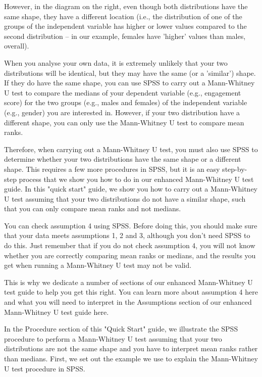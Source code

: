 \documentclass[]{article}
\begin{document}
However, in the diagram on the right, even though both distributions have the same shape, they have a different location (i.e., the distribution of one of the groups of the independent variable has higher or lower values compared to the second distribution – in our example, females have 'higher' values than males, overall).

When you analyse your own data, it is extremely unlikely that your two distributions will be identical, but they may have the same (or a 'similar') shape. If they do have the same shape, you can use SPSS to carry out a Mann-Whitney U test to compare the medians of your dependent variable (e.g., engagement score) for the two groups (e.g., males and females) of the independent variable (e.g., gender) you are interested in. However, if your two distribution have a different shape, you can only use the Mann-Whitney U test to compare mean ranks.

Therefore, when carrying out a Mann-Whitney U test, you must also use SPSS to determine whether your two distributions have the same shape or a different shape. This requires a few more procedures in SPSS, but it is an easy step-by-step process that we show you how to do in our enhanced Mann-Whitney U test guide. In this "quick start" guide, we show you how to carry out a Mann-Whitney U test assuming that your two distributions do not have a similar shape, such that you can only compare mean ranks and not medians.

You can check assumption 4 using SPSS. Before doing this, you should make sure that your data meets assumptions 1, 2 and 3, although you don't need SPSS to do this. Just remember that if you do not check assumption 4, you will not know whether you are correctly comparing mean ranks or medians, and the results you get when running a Mann-Whitney U test may not be valid. 

This is why we dedicate a number of sections of our enhanced Mann-Whitney U test guide to help you get this right. You can learn more about assumption 4 here and what you will need to interpret in the Assumptions section of our enhanced Mann-Whitney U test guide here.

In the Procedure section of this "Quick Start" guide, we illustrate the SPSS procedure to perform a Mann-Whitney U test assuming that your two distributions are not the same shape and you have to interpret mean ranks rather than medians. First, we set out the example we use to explain the Mann-Whitney U test procedure in SPSS.
\end{document}
